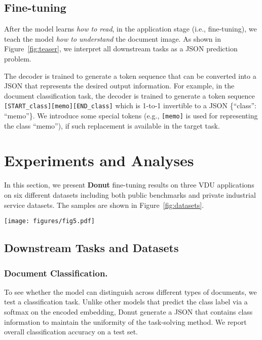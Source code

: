 \documentclass[runningheads]{llncs}
\newcommand\ours{{{\mbox{Donut}}}\xspace}
\newcommand\oursb{{\textbf{\mbox{Donut}}}\xspace}
\begin{document}
\subsection{Fine-tuning}
After the model learns \textit{how to read}, in the application stage (i.e., fine-tuning), we teach the model \textit{how to understand} the document image.
As shown in Figure~\ref{fig:teaser}, we interpret all downstream tasks as a JSON prediction problem.

The decoder is trained to generate a token sequence that can be converted into a JSON that represents the desired output information. For example, in the document classification task, the decoder is trained to generate a token sequence \texttt{\small [START\_class][memo][END\_class]} which is 1-to-1 invertible to a JSON \{``class'': ``memo''\}.
We introduce some special tokens (e.g., \texttt{\small [memo]} is used for representing the class ``memo''), if such replacement is available in the target task.
 
\section{Experiments and Analyses}\label{sec:exp}
In this section, we present \oursb fine-tuning results on three VDU applications on six different datasets including both public benchmarks and private industrial service datasets. The samples are shown in Figure~\ref{fig:datasets}. 

\begin{figure*}[t!]
    \centering
    \texttt{[image: figures/fig5.pdf]}
    \caption{{\bf Samples of the downstream datasets.} (a) Document Classification. (b) Document Information Extraction. (c) Document Visual Question Answering} \label{fig:datasets}
\end{figure*}



\subsection{Downstream Tasks and Datasets}
\subsubsection{Document Classification.}
To see whether the model can distinguish across different types of documents, we test a classification task.
Unlike other models that predict the class label via a softmax on the encoded embedding, \ours generate a JSON that contains class information to maintain the uniformity of the task-solving method.
We report overall classification accuracy on a test set.
\end{document}
